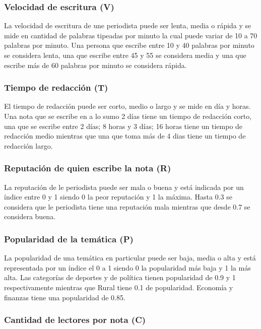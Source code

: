\documentclass{article}
\begin{document}
\subsubsection*{Velocidad de escritura (V)}

La velocidad de escritura de une periodista puede ser lenta, media o rápida y se mide en cantidad de palabras tipeadas por minuto la cual puede variar de 10 a 70 palabras por minuto. Una persona que escribe entre 10 y 40 palabras por minuto se considera lenta, una que escribe entre 45 y 55 se considera media y una que escribe más de 60 palabras por minuto se considera rápida.

\subsubsection*{Tiempo de redacción (T)}

El tiempo de redacción puede ser corto, medio o largo y se mide en día y horas. Una nota que se escribe en a lo sumo 2 días tiene un tiempo de redacción corto, una que se escribe entre 2 días; 8 horas y 3 días; 16 horas tiene un tiempo de redacción medio mientras que una que toma más de 4 dias tiene un tiempo de redacción largo.

\subsubsection*{Reputación de quien escribe la nota (R)}

La reputación de le periodista puede ser mala o buena y está indicada por un índice entre 0 y 1 siendo 0 la peor reputación y 1 la máxima. Hasta 0.3 se considera que le periodista tiene una reputación mala mientras que desde 0.7 se considera buena.

\subsubsection*{Popularidad de la temática (P)}

La popularidad de una temática en particular puede ser baja, media o alta y está representada por un índice el 0 a 1 siendo 0 la popularidad más baja y 1 la más alta. Las categorías de deportes y de política tienen popularidad de 0.9 y 1 respectivamente mientras que Rural tiene 0.1 de popularidad. Economía y finanzas tiene una popularidad de 0.85.

\subsubsection*{Cantidad de lectores por nota (C)}
\end{document}
